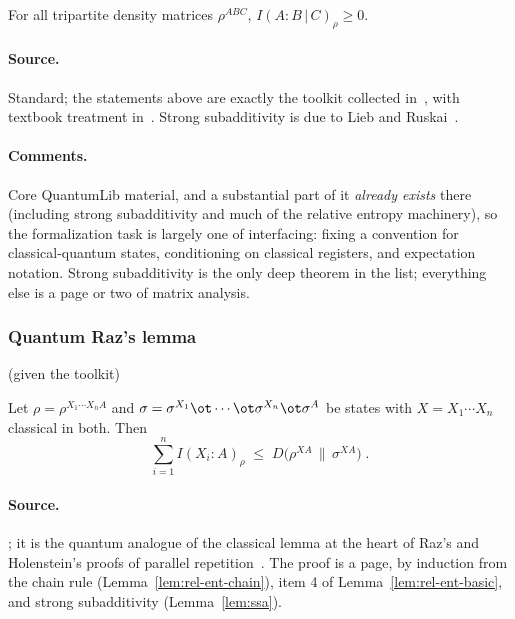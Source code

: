 \begin{lemma}
\label{lem:ssa}
\qlib{}
For all tripartite density matrices $\rho^{ABC}$, $I(A : B \,|\, C)_\rho \geq 0$.
\end{lemma}

\paragraph{Source.} Standard; the statements above are exactly the toolkit collected
in~\cite[Section 5.1]{BVY17}, with textbook treatment in~\cite[Chapter 11]{Wil13}.
Strong subadditivity is due to Lieb and Ruskai~\cite{LR73}.

\paragraph{Comments.} Core QuantumLib material, and a substantial part of it
\emph{already exists} there (including strong subadditivity and much of the relative
entropy machinery), so the formalization task is largely one of interfacing: fixing a
convention for classical-quantum states, conditioning on classical registers, and
expectation notation. Strong subadditivity is the only deep theorem in the list;
everything else is a page or two of matrix analysis.

\subsubsection{Quantum Raz's lemma}
\label{sec:ar-raz}

\effortEasy{} (given the toolkit) \qlib

\begin{lemma}
\label{lem:quantum-raz}
\qlib{}
Let $\rho = \rho^{X_1 \cdots X_n A}$ and $\sigma = \sigma^{X_1} \ot \cdots \ot
\sigma^{X_n} \ot \sigma^A$ be states with $X = X_1 \cdots X_n$ classical in both.
Then
\begin{equation*}
  \sum_{i=1}^{n} I(X_i : A)_\rho \;\leq\; D\bigl(\rho^{XA} \,\|\, \sigma^{XA}\bigr)\;.
\end{equation*}
\end{lemma}

\paragraph{Source.} \cite[Lemma 5.10]{BVY17}; it is the quantum analogue of the
classical lemma at the heart of Raz's and Holenstein's proofs of parallel
repetition~\cite{Raz98,Hol09}. The proof is a page, by induction from the chain rule
(Lemma~\ref{lem:rel-ent-chain}), item 4 of Lemma~\ref{lem:rel-ent-basic}, and strong
subadditivity (Lemma~\ref{lem:ssa}).

